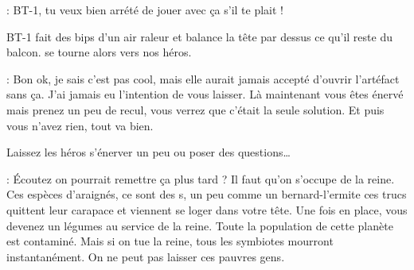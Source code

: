 \begin{quotebox}
\noindent\textbf{}: BT-1, tu veux bien arrété de jouer avec ça s’il te plait !
\end{quotebox}
BT-1 fait des bips d’un air raleur et balance la tête par dessus ce qu’il reste du balcon.  se tourne alors vers nos héros.
\begin{quotebox}
\noindent\textbf{}: Bon ok, je sais c’est pas cool, mais elle aurait jamais accepté d’ouvrir l’artéfact sans ça. J’ai jamais eu l’intention de vous laisser. Là maintenant vous êtes énervé mais prenez un peu de recul, vous verrez que c’était la seule solution. Et puis vous n’avez rien, tout va bien.
\end{quotebox}
Laissez les héros s’énerver un peu ou poser des questions\dots
\begin{quotebox}
\noindent\textbf{}: \'Ecoutez on pourrait remettre ça plus tard ? Il faut qu’on s’occupe de la reine. Ces espèces d’araignés, ce sont des s, un peu comme un bernard-l’ermite ces trucs quittent leur carapace et viennent se loger dans votre tête. Une fois en place, vous devenez un légumes au service de la reine. Toute la population de cette planète est contaminé. Mais si on tue la reine, tous les symbiotes mourront instantanément. On ne peut pas laisser ces pauvres gens.
\end{quotebox}
